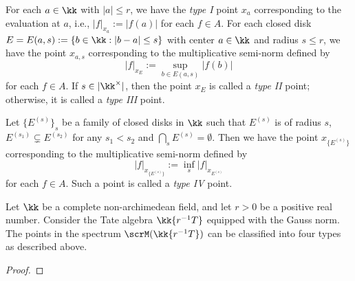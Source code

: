     For each \(a \in \kk\) with \(|a| \leq r\), we have the \emph{type I} point \(x_a\) corresponding to the evaluation at \(a\), i.e., \(|f|_{x_a} := |f(a)|\) for each \(f \in A\).
    For each closed disk \(E = E(a,s) := \{b \in \kk : |b - a| \leq s\}\) with center \(a \in \kk\) and radius \(s \leq r\), we have the point \(x_{a,s}\) corresponding to the multiplicative semi-norm defined by
    \[ |f|_{x_E} := \sup_{b \in E(a,s)} |f(b)| \]
    for each \(f \in A\).
    If \(s \in |\kk^\times|\), then the point \(x_E\) is called a \emph{type II} point; otherwise, it is called a \emph{type III} point.
    
    Let \(\{E^{(s)}\}_s\) be a family of closed disks in \(\kk\) such that \(E^{(s)}\) is of radius \(s\), \(E^{(s_1)} \subsetneq E^{(s_2)}\) for any \(s_1 < s_2\) and \(\bigcap_s E^{(s)} = \emptyset\).
    Then we have the point \(x_{\{E^{(s)}\}}\) corresponding to the multiplicative semi-norm defined by
    \[ |f|_{x_{\{E^{(s)}\}}} := \inf_s |f|_{x_{E^{(s)}}} \]
    for each \(f \in A\).
    Such a point is called a \emph{type IV} point.


    \begin{proposition}\label{prop:four_types_of_points_in_spectrum_of_Tate_algebra_in_one_variable}
        Let \(\kk\) be a complete non-archimedean field, and let \(r > 0\) be a positive real number.
        Consider the Tate algebra \(\kk\{r^{-1}T\}\) equipped with the Gauss norm.
        The points in the spectrum \(\scrM(\kk\{r^{-1}T\})\) can be classified into four types as described above.
    \end{proposition}
    \begin{proof}
    \end{proof}

